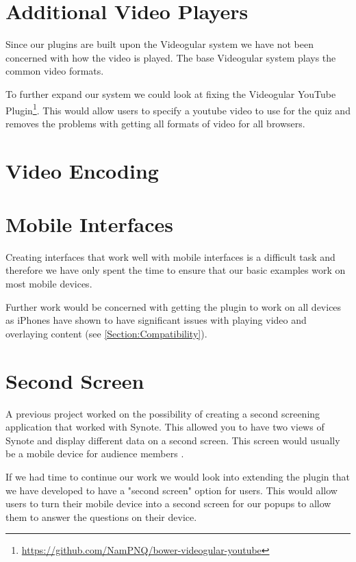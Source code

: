 \section{Additional Video Players}

Since our plugins are built upon the \gls{Videogular} system we have not been concerned with how the video is played. The base \gls{Videogular} system plays the common video formats.

To further expand our system we could look at fixing the \gls{Videogular} YouTube Plugin\footnote{\url{https://github.com/NamPNQ/bower-videogular-youtube}}. This would allow users to specify a youtube video to use for the quiz and removes the problems with getting all formats of video for all browsers.

\section{Video Encoding}


\section{Mobile Interfaces}

Creating interfaces that work well with mobile interfaces is a difficult task and therefore we have only spent the time to ensure that our basic examples work on most mobile devices.

Further work would be concerned with getting the plugin to work on all devices as iPhones have shown to have significant issues with playing video and overlaying content (see \autoref{Section:Compatibility}).

\section{Second Screen}

A previous project  worked on the possibility of creating a second screening application that worked with Synote. This allowed you to have two views of Synote and display different data on a second screen. This screen would usually be a mobile device for audience members .

If we had time to continue our work we would look into extending the plugin that we have developed to have a "second screen" option for users. This would allow users to turn their mobile device into a second screen for our popups to allow them to answer the questions on their device.

